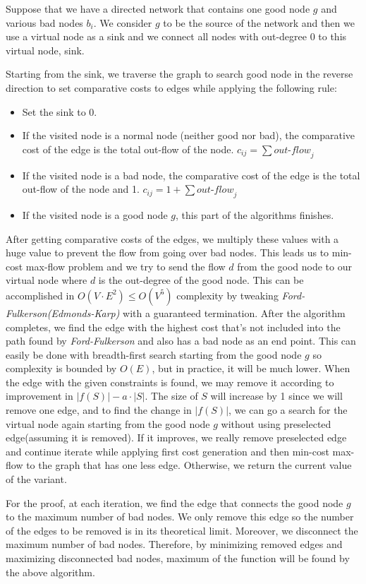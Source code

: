 Suppose that we have a directed network that contains one good node $g$ and various bad nodes $b_i$. We consider $g$ to be the source of the network and then we use a virtual node as a sink and we connect all nodes with out-degree 0 to this virtual node, sink.

Starting from the sink, we traverse the graph to search good node in the reverse direction to set comparative costs to edges while applying the following rule:
\begin{itemize}
  \item Set the sink to 0.
  \item If the visited node is a normal node (neither good nor bad), the comparative cost of the edge is the total out-flow of the node. $c_{ij} = \sum \textit{out-flow}_j$
  \item If the visited node is a bad node, the comparative cost of the edge is the total out-flow of the node and 1. $c_{ij} = 1 + \sum \textit{out-flow}_j$
  \item If the visited node is a good node $g$, this part of the algorithms finishes.
\end{itemize}

After getting comparative costs of the edges, we multiply these values with a huge value to prevent the flow from going over bad nodes. This leads us to min-cost max-flow problem and we try to send the flow $d$ from the good node to our virtual node where $d$ is the out-degree of the good node. This can be accomplished in $O(V \cdot E^2) \leq O(V^5)$ complexity by tweaking \textit{Ford-Fulkerson(Edmonds-Karp)} with a guaranteed termination. After the algorithm completes, we find the edge with the highest cost that's not included into the path found by \textit{Ford-Fulkerson} and also has a bad node as an end point. This can easily be done with breadth-first search starting from the good node $g$ so complexity is bounded by $O(E)$, but in practice, it will be much lower. When the edge with the given constraints is found, we may remove it according to improvement in $|f(S)| - a \cdot |S|$. The size of $S$ will increase by 1 since we will remove one edge, and to find the change in $|f(S)|$, we can go a search for the virtual node again starting from the good node $g$ without using preselected edge(assuming it is removed). If it improves, we really remove preselected edge and continue iterate while applying first cost generation and then min-cost max-flow to the graph that has one less edge. Otherwise, we return the current value of the variant.

For the proof, at each iteration, we find the edge that connects the good node $g$ to the maximum number of bad nodes. We only remove this edge so the number of the edges to be removed is in its theoretical limit. Moreover, we disconnect the maximum number of bad nodes. Therefore, by minimizing removed edges and maximizing disconnected bad nodes, maximum of the function will be found by the above algorithm.